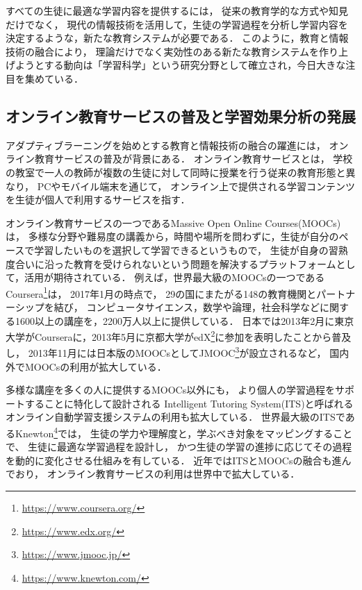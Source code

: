 すべての生徒に最適な学習内容を提供するには，
従来の教育学的な方式や知見だけでなく，
現代の情報技術を活用して，生徒の学習過程を分析し学習内容を決定するような，新たな教育システムが必要である．
このように，教育と情報技術の融合により，
理論だけでなく実効性のある新たな教育システムを作り上げようとする動向は「学習科学」という研究分野として確立され，今日大きな注目を集めている\cite{白水始2014学習科学の新展開}．


\subsection{オンライン教育サービスの普及と学習効果分析の発展}
アダプティブラーニングを始めとする教育と情報技術の融合の躍進には，
オンライン教育サービスの普及が背景にある．
オンライン教育サービスとは，
学校の教室で一人の教師が複数の生徒に対して同時に授業を行う従来の教育形態と異なり，
PCやモバイル端末を通じて，
オンライン上で提供される学習コンテンツを生徒が個人で利用するサービスを指す．

オンライン教育サービスの一つであるMassive Open Online Courses(MOOCs)\cite{mcauley2010mooc, pappano2012year,siemens2013massive}は，
多様な分野や難易度の講義から，時間や場所を問わずに，生徒が自分のペースで学習したいものを選択して学習できるというもので，
生徒が自身の習熟度合いに沿った教育を受けられないという問題を解決するプラットフォームとして，活用が期待されている．
例えば，世界最大級のMOOCsの一つであるCoursera\footnote{\url{https://www.coursera.org/}}は，
2017年1月の時点で，
29の国にまたがる148の教育機関とパートナーシップを結び，
コンピュータサイエンス，数学や論理，社会科学などに関する1600以上の講座を，2200万人以上に提供している．
日本では2013年2月に東京大学がCourseraに，2013年5月に京都大学がedX\footnote{\url{https://www.edx.org/}}に参加を表明したことから普及し，
2013年11月には日本版のMOOCsとしてJMOOC\footnote{\url{https://www.jmooc.jp/}}が設立されるなど，
国内外でMOOCsの利用が拡大している．

多様な講座を多くの人に提供するMOOCs以外にも，
より個人の学習過程をサポートすることに特化して設計される
Intelligent Tutoring System(ITS)と呼ばれるオンライン自動学習支援システムの利用も拡大している．
世界最大級のITSであるKnewton\footnote{\url{https://www.knewton.com/}}では，
生徒の学力や理解度と，学ぶべき対象をマッピングすることで、
生徒に最適な学習過程を設計し，
かつ生徒の学習の進捗に応じてその過程を動的に変化させる仕組みを有している\cite{upbin2012knewton}．
近年ではITSとMOOCsの融合も進んでおり\cite{aleven2015beginning}，
オンライン教育サービスの利用は世界中で拡大している．

